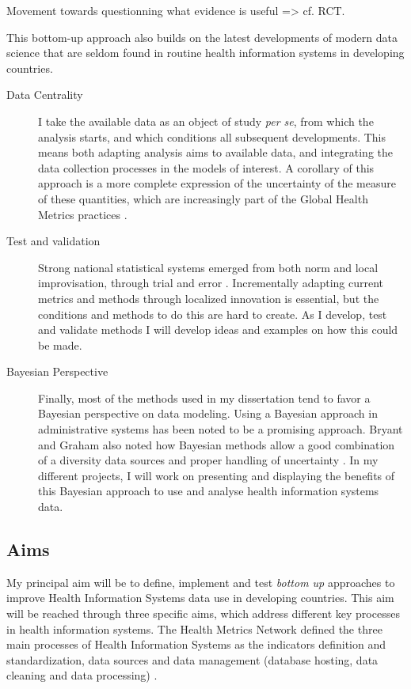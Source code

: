 Movement towards questionning what evidence is useful => cf. RCT.

This bottom-up approach also builds on the latest developments of modern data science that are seldom found in routine health information systems in developing countries.

\begin{description}
\item[Data Centrality] I take the available data as an object of study \textit{per se}, from which the analysis starts, and which conditions all subsequent developments. This means both adapting analysis aims to available data, and integrating the data collection processes in the models of interest. A corollary of this approach is a more complete expression of the uncertainty of the measure of these quantities, which are increasingly part of the Global Health Metrics practices \citep{murray_towards_2007}. %
\item[Test and validation] Strong national statistical systems emerged from both norm and local improvisation, through trial and error \citep{lecuyer_medecins_1987,chaperon_information_1988}. Incrementally adapting current metrics and  methods through localized innovation is essential, but the conditions and methods to do this are hard to create. As I develop, test and validate methods I will develop ideas and examples on how this could be made.
\item[Bayesian Perspective] Finally, most of the methods used in my dissertation tend to favor a Bayesian perspective on data modeling. Using a Bayesian approach in administrative systems has been noted to be a promising approach\citep{fienberg_bayesian_2011,little_calibrated_2012}. Bryant and Graham also noted how Bayesian methods allow a good combination of a diversity data sources and proper handling of uncertainty \citep{bryant_bayesian_2013}. In my different projects, I will work on presenting and displaying the benefits of this Bayesian approach to use and analyse health information systems data.
\end{description}


\subsection{Aims}

My principal aim will be to define, implement and test \textit{bottom up} approaches to improve Health Information Systems data use in developing countries. This aim will be reached through three specific aims, which address different key processes in health information systems. The Health Metrics Network defined the three main processes of Health Information Systems as the indicators definition and standardization, data sources and data management (database hosting, data cleaning and data processing) \citep{health_metrics_network_framework_2008}.

